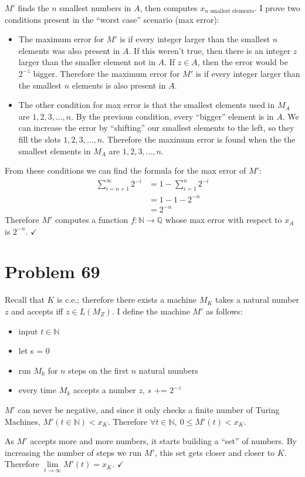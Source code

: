 \documentclass[11pt]{article}
\let\imp\rightarrow
\begin{document}
$M'$ finds the $n$ smallest numbers in $A$, then computes $x_{n \text{ smallest elements}}$.
I prove two conditions present in the ``worst case'' scenario (max error):
\begin{itemize}
	\item The maximum error for $M'$ is if every integer larger than the smallest $n$ elements was also present in $A$.
	If this weren't true, then there is an integer $z$ larger than the smaller element not in $A$.
	If $z \in A$, then the error would be $2^{-z}$ bigger.
	Therefore the maximum error for $M'$ is if every integer larger than the smallest $n$ elements is also present in $A$.
	\item The other condition for max error is that the smallest elements used in $M_A$ are $1,2,3, \ldots, n$.
	By the previous condition, every ``bigger'' element is in $A$.
	We can increase the error by ``shifting'' our smallest elements to the left, so they fill the slots $1, 2, 3, \ldots, n$.
	Therefore the maximum error is found when the the smallest elements in $M_A$ are $1,2,3, \ldots, n$.
\end{itemize}

From these conditions we can find the formula for the max error of $M'$:
\begin{align*}
	\sum \limits _{i=n+1} ^{\infty} 2^{-i}&= 1 - \sum \limits _{i=1} ^{n} 2^{-i} \\
	&= 1 - 1 - 2^{-n} \\
	&= 2^{-n}
\end{align*}
Therefore $M'$ computes a function $f: \mathbb{N} \imp \mathbb{Q}$ whose max error with respect to $x_A$ is $2^{-n}$. $\checkmark$


\section*{Problem 69}

Recall that $K$ is c.e.; therefore there exists a machine $M_K$ takes a natural number $z$ and accepts iff $z \in L(M_Z)$.
I define the machine $M'$ as follows:
\begin{itemize}
	\item input $t \in \mathbb{N}$
	\item let s = 0
	\item run $M_k$ for $n$ steps on the first $n$ natural numbers
	\item every time $M_k$ accepts a number $z$, $s$ += $2^{-z}$
\end{itemize}

$M'$ can never be negative, and since it only checks a finite number of Turing Machines, $M'(t \in \mathbb{N}) < x_K$.
Therefore $\forall t \in \mathbb{N},\ 0 \leq M'(t) < x_K$.

As $M'$ accepts more and more numbers, it starts building a ``set'' of numbers.
By increasing the number of steps we run $M'$, this set gets closer and closer to $K$.
Therefore $\lim \limits _{t \imp \infty} M'(t) = x_K$. $\checkmark$
\end{document}
